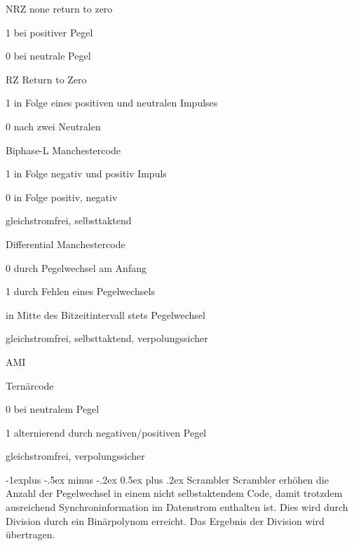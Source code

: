 \documentclass[a4paper]{article}
\makeatletter
\renewcommand{\subsection}{\@startsection{subsection}{2}{0mm}%
                                {-1explus -.5ex minus -.2ex}%
                                {0.5ex plus .2ex}%
                                {\normalfont\normalsize\bfseries}}
\makeatother
\begin{document}
\begin{multicols}{3}
    \begin{description*}
        \item[NRZ] none return to zero
        \begin{itemize*}
            \item 1 bei positiver Pegel 
            \item 0 bei neutrale Pegel
        \end{itemize*}
        \item[RZ] Return to Zero
        \begin{itemize*} 
            \item 1 in Folge eines positiven und neutralen Impulses 
            \item 0 nach zwei Neutralen 
        \end{itemize*}
        \item[Biphase-L] Manchestercode
        \begin{itemize*} 
            \item 1 in Folge negativ und positiv Impuls 
            \item 0 in Folge positiv, negativ 
            \item gleichstromfrei, selbsttaktend
        \end{itemize*}
        \item[Differential] Manchestercode
        \begin{itemize*} 
            \item 0 durch Pegelwechsel am Anfang 
            \item 1 durch Fehlen eines Pegelwechsels 
            \item in Mitte des Bitzeitintervall stets Pegelwechsel 
            \item gleichstromfrei, selbsttaktend, verpolungssicher
        \end{itemize*}
        \item[AMI]
        \begin{itemize*} 
            \item Ternärcode 
            \item 0 bei neutralem Pegel 
            \item 1 alternierend durch negativen/positiven Pegel 
            \item gleichstromfrei, verpolungssicher
        \end{itemize*}
    \end{description*}
    
    \subsection{Scrambler}
    Scrambler erhöhen die Anzahl der Pegelwechsel in einem nicht selbstaktendem Code, damit trotzdem ausreichend Synchroninformation im Datenstrom enthalten ist. Dies wird durch Division durch ein Binärpolynom erreicht. Das Ergebnis der Division wird übertragen.
    

\end{multicols}
\end{document}
